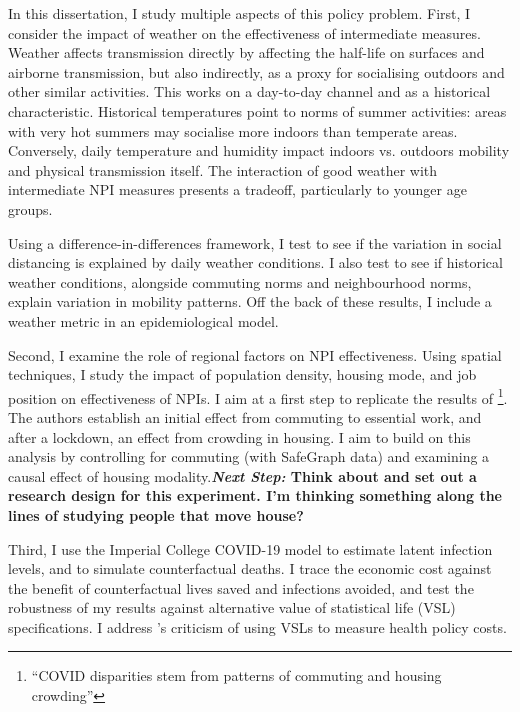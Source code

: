\documentclass{article}
\begin{document}
In this dissertation, I study multiple aspects of this policy problem. First, I consider the impact of weather on the effectiveness of intermediate measures. Weather affects transmission directly by affecting the half-life on surfaces and airborne transmission, but also indirectly, as a proxy for socialising outdoors and other similar activities. This works on a day-to-day channel and as a historical characteristic. Historical temperatures point to norms of summer activities: areas with very hot summers may socialise more indoors than temperate areas. Conversely, daily temperature and humidity impact indoors vs. outdoors mobility and physical transmission itself. The interaction of good weather with intermediate NPI measures presents a tradeoff, particularly to younger age groups. 

Using a difference-in-differences framework, I test to see if the variation in social distancing is explained by daily weather conditions. I also test to see if historical weather conditions, alongside commuting norms and neighbourhood norms, explain variation in mobility patterns. Off the back of these results, I include a weather metric in an epidemiological model.

Second, I examine the role of regional factors on NPI effectiveness. Using spatial techniques, I study the impact of population density, housing mode, and job position on effectiveness of NPIs. I aim at a first step to replicate the results of \cite{almagroRacialDisparitiesFrontline2020}\footnote{``COVID disparities stem from patterns of commuting and housing crowding''}. The authors establish an initial effect from commuting to essential work, and after a lockdown, an effect from crowding in housing. I aim to build on this analysis by controlling for commuting (with SafeGraph data) and examining a causal effect of housing modality.\textbf{\textit{Next Step:} Think about and set out a research design for this experiment. I'm thinking something along the lines of studying people that move house?}
 
Third, I use the Imperial College COVID-19 model to estimate latent infection levels, and to simulate counterfactual deaths. I trace the economic cost against the benefit of counterfactual lives saved and infections avoided, and test the robustness of my results against alternative value of statistical life (VSL) specifications. I address \textcite{pindyckCOVID19WelfareEffects2020}'s criticism of using VSLs to measure health policy costs.
\end{document}
